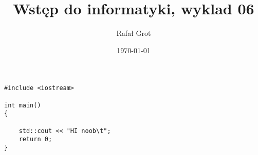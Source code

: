 \documentclass[11pt]{article}
\author{Rafał Grot}
\date{\today}
\title{Wstęp do informatyki, wyklad 06}
\begin{document}
\maketitle
\tableofcontents

\begin{verbatim}
#include <iostream>

int main()
{

    std::cout << "HI noob\t";
    return 0;
}
\end{verbatim}
\end{document}
